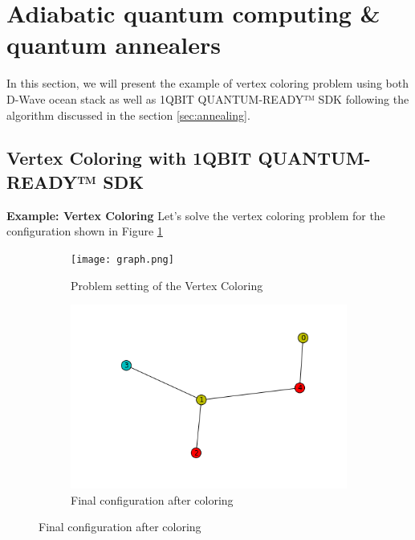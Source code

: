 \section{Adiabatic quantum computing \& quantum annealers}


 
In this section, we will present the example of vertex coloring problem using both D-Wave ocean stack as well as 1QBIT QUANTUM-READY™ SDK following the algorithm discussed in the section \ref{sec:annealing}.


\subsection{Vertex Coloring with 1QBIT QUANTUM-READY™ SDK }
\begin{tcolorbox}[standard jigsaw,
    opacityback=0,  %
    boxrule=0.5pt,label={vertexcoloring}]
    {\bf Example: Vertex Coloring}
    \tcbline 
    Let’s solve the vertex coloring problem for the configuration shown in Figure \ref{fig:graph}
\end{tcolorbox}
\begin{figure}[h!]
\caption{Problem setting and sample solution of vertex coloring problem}
    \centering
    \begin{subfigure}[b]{0.4\textwidth}
        \texttt{[image: graph.png]}
        \caption{Problem setting of the Vertex Coloring}
        \label{fig:graph}
    \end{subfigure}
     \begin{subfigure}[b]{0.4\textwidth}
        \includegraphics[width=\textwidth]{figures/colored.png}
        \caption{Final configuration after coloring}
        \label{fig:coloured}
    \end{subfigure}
\end{figure}
